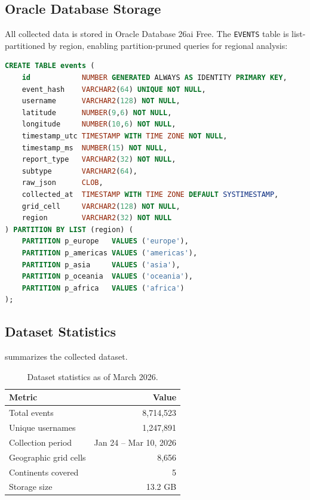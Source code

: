 \documentclass[11pt,a4paper]{article}
\begin{document}
\subsection{Oracle Database Storage}

All collected data is stored in Oracle Database 26ai Free. The \texttt{EVENTS} table is list-partitioned by region, enabling partition-pruned queries for regional analysis:

\begin{lstlisting}[language=SQL, caption={Events table with list partitioning by region.}]
CREATE TABLE events (
    id            NUMBER GENERATED ALWAYS AS IDENTITY PRIMARY KEY,
    event_hash    VARCHAR2(64) UNIQUE NOT NULL,
    username      VARCHAR2(128) NOT NULL,
    latitude      NUMBER(9,6) NOT NULL,
    longitude     NUMBER(10,6) NOT NULL,
    timestamp_utc TIMESTAMP WITH TIME ZONE NOT NULL,
    timestamp_ms  NUMBER(15) NOT NULL,
    report_type   VARCHAR2(32) NOT NULL,
    subtype       VARCHAR2(64),
    raw_json      CLOB,
    collected_at  TIMESTAMP WITH TIME ZONE DEFAULT SYSTIMESTAMP,
    grid_cell     VARCHAR2(128) NOT NULL,
    region        VARCHAR2(32) NOT NULL
) PARTITION BY LIST (region) (
    PARTITION p_europe   VALUES ('europe'),
    PARTITION p_americas VALUES ('americas'),
    PARTITION p_asia     VALUES ('asia'),
    PARTITION p_oceania  VALUES ('oceania'),
    PARTITION p_africa   VALUES ('africa')
);
\end{lstlisting}

\subsection{Dataset Statistics}

 summarizes the collected dataset.

\begin{table}[ht]
\centering
\caption{Dataset statistics as of March 2026.}
\label{tab:dataset_stats}
\begin{tabular}{lr}
\toprule
\textbf{Metric} & \textbf{Value} \\
\midrule
Total events          & 8,714,523 \\
Unique usernames      & 1,247,891 \\
Collection period     & Jan 24 -- Mar 10, 2026 \\
Geographic grid cells & 8,656 \\
Continents covered    & 5 \\
Storage size          & 13.2 GB \\
\bottomrule
\end{tabular}
\end{table}
\end{document}
